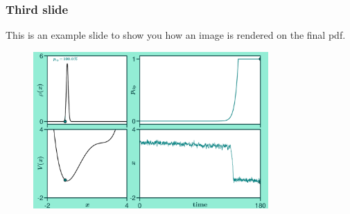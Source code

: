 \documentclass[./main.tex]{subfiles}
\begin{document}
\begin{frame}[label=slide03]
        \frametitle{Third slide}

        This is an example slide to show you how an image is rendered on the final pdf.
        \begin{figure}
                \centering
                \includegraphics[keepaspectratio, width=0.8\textwidth]{../figures/figure.png}
        \end{figure}
 
\end{frame}
\end{document}
